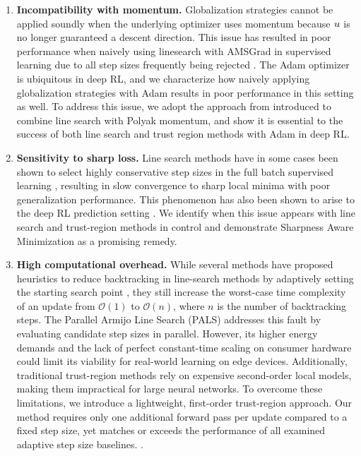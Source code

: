 \begin{enumerate}
\item \textbf{Incompatibility with momentum.} Globalization strategies cannot be applied soundly when the underlying optimizer uses momentum because $u$ is no longer guaranteed a descent direction. This issue has resulted in poor performance when naively using linesearch with AMSGrad  in supervised learning due to all step sizes frequently being rejected . The Adam optimizer \cite{kingma2015adam} is ubiquitous in deep RL, and we characterize how naively applying globalization strategies with Adam results in poor performance in this setting as well. To address this issue, we adopt the approach from \cite{vaswani2020adaptive} introduced to combine line search with Polyak momentum, and show it is essential to the success of both line search and trust region methods with Adam in deep RL.
\item \textbf{Sensitivity to sharp loss.} Line search methods have in some cases been shown to select highly conservative step sizes in the full batch supervised learning , resulting in slow convergence to sharp local minima with poor generalization performance. This phenomenon has also been shown to arise to the deep RL prediction setting \cite{PALS2026}. We identify when this issue appears with line search and trust-region methods in control and demonstrate Sharpness Aware Minimization  as a promising remedy. 
\item \textbf{High computational overhead.} While several methods have proposed heuristics to reduce backtracking in line-search methods by adaptively setting the starting search point \cite{vaswani2019painless}, they still increase the worst-case time complexity of an update from $\mathcal{O}(1)$ to $\mathcal{O}(n)$, where $n$ is the number of backtracking steps. The Parallel Armijo Line Search (PALS) \cite{PALS2026} addresses this fault by evaluating candidate step sizes in parallel. However, its higher energy demands and the lack of perfect constant-time scaling on consumer hardware could limit its viability for real-world learning on edge devices. Additionally, traditional trust-region methods rely on expensive second-order local models, making them impractical for large neural networks. To overcome these limitations, we introduce a lightweight, first-order trust-region approach. Our method requires only one additional forward pass per update compared to a fixed step size, yet matches or exceeds the performance of all examined adaptive step size baselines. .
\end{enumerate}

